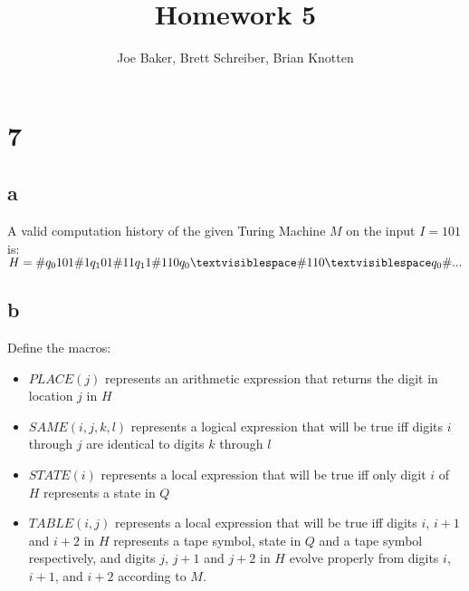 \documentclass[letterpaper,notitlepage,twoside]{article}
\begin{document}
\title{Homework 5}
\author{Joe Baker, Brett Schreiber, Brian Knotten}
\maketitle

\section*{7}

\subsection*{a}
A valid computation history of the given Turing Machine $M$ on the input $I = 101$ is: \\
$H = \#q_{0}101\#1q_{1}01\#11q_{1}1\#110q_{0}\textvisiblespace \#110\textvisiblespace q_{0}\#...$ \\

\subsection*{b}
Define the macros:
\begin{itemize}
\item $PLACE(j)$ represents an arithmetic expression that returns the digit in location $j$ in $H$
\item $SAME(i, j, k, l)$ represents a logical expression that will be true iff digits $i$ through $j$ are identical to digits $k$ through $l$
\item $STATE(i)$ represents a local expression that will be true iff only digit $i$ of $H$ represents a state in $Q$
\item $TABLE(i, j)$ represents a local expression that will be true iff digits $i$, $i+1$ and $i+2$ in $H$ represents a tape symbol, state in $Q$ and a tape symbol respectively, and digits $j$, $j+1$ and $j+2$ in $H$ evolve properly from digits $i$, $i+1$, and $i+2$ according to $M$.
\end{itemize}
\end{document}
